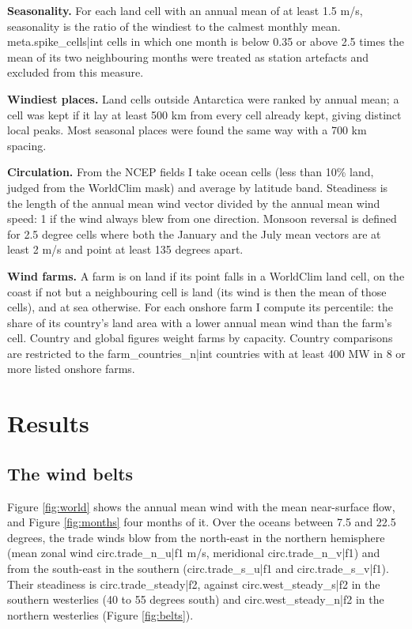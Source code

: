 \documentclass[11pt,a4paper]{article}
\begin{document}
\textbf{Seasonality.} For each land cell with an annual mean of at least 1.5 m/s, seasonality is the ratio of the windiest to the calmest monthly mean. {{meta.spike_cells|int}} cells in which one month is below 0.35 or above 2.5 times the mean of its two neighbouring months were treated as station artefacts and excluded from this measure.

\textbf{Windiest places.} Land cells outside Antarctica were ranked by annual mean; a cell was kept if it lay at least 500 km from every cell already kept, giving distinct local peaks. Most seasonal places were found the same way with a 700 km spacing.

\textbf{Circulation.} From the NCEP fields I take ocean cells (less than 10\% land, judged from the WorldClim mask) and average by latitude band. Steadiness is the length of the annual mean wind vector divided by the annual mean wind speed: 1 if the wind always blew from one direction. Monsoon reversal is defined for 2.5 degree cells where both the January and the July mean vectors are at least 2 m/s and point at least 135 degrees apart.

\textbf{Wind farms.} A farm is on land if its point falls in a WorldClim land cell, on the coast if not but a neighbouring cell is land (its wind is then the mean of those cells), and at sea otherwise. For each onshore farm I compute its percentile: the share of its country's land area with a lower annual mean wind than the farm's cell. Country and global figures weight farms by capacity. Country comparisons are restricted to the {{farm_countries_n|int}} countries with at least 400 MW in 8 or more listed onshore farms.

\section{Results}

\subsection{The wind belts}
Figure \ref{fig:world} shows the annual mean wind with the mean near-surface flow, and Figure \ref{fig:months} four months of it. Over the oceans between 7.5 and 22.5 degrees, the trade winds blow from the north-east in the northern hemisphere (mean zonal wind {{circ.trade_n_u|f1}} m/s, meridional {{circ.trade_n_v|f1}}) and from the south-east in the southern ({{circ.trade_s_u|f1}} and {{circ.trade_s_v|f1}}). Their steadiness is {{circ.trade_steady|f2}}, against {{circ.west_steady_s|f2}} in the southern westerlies (40 to 55 degrees south) and {{circ.west_steady_n|f2}} in the northern westerlies (Figure \ref{fig:belts}).
\end{document}
